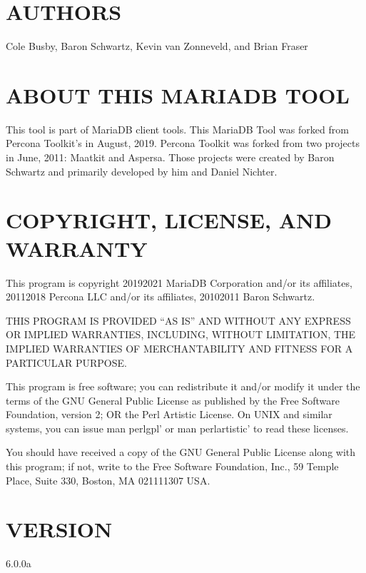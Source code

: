 \documentclass[letterpaper,10pt,english]{sphinxmanual}
\begin{document}
\section{AUTHORS}
\label{\detokenize{mariadb-system-summary:authors}}
Cole Busby, Baron Schwartz, Kevin van Zonneveld, and Brian Fraser


\section{ABOUT THIS MARIADB TOOL}
\label{\detokenize{mariadb-system-summary:about-this-mariadb-tool}}
This tool is part of MariaDB client tools. This MariaDB Tool was forked from
Percona Toolkit’s  in August, 2019. Percona Toolkit was
forked from two projects in June, 2011: Maatkit and Aspersa.  Those projects
were created by Baron Schwartz and primarily developed by him and Daniel Nichter.


\section{COPYRIGHT, LICENSE, AND WARRANTY}
\label{\detokenize{mariadb-system-summary:copyright-license-and-warranty}}
This program is copyright 2019\sphinxhyphen{}2021 MariaDB Corporation and/or its affiliates,
2011\sphinxhyphen{}2018 Percona LLC and/or its affiliates, 2010\sphinxhyphen{}2011 Baron Schwartz.

THIS PROGRAM IS PROVIDED “AS IS” AND WITHOUT ANY EXPRESS OR IMPLIED
WARRANTIES, INCLUDING, WITHOUT LIMITATION, THE IMPLIED WARRANTIES OF
MERCHANTABILITY AND FITNESS FOR A PARTICULAR PURPOSE.

This program is free software; you can redistribute it and/or modify it under
the terms of the GNU General Public License as published by the Free Software
Foundation, version 2; OR the Perl Artistic License.  On UNIX and similar
systems, you can issue \textasciigrave{}man perlgpl’ or \textasciigrave{}man perlartistic’ to read these
licenses.

You should have received a copy of the GNU General Public License along with
this program; if not, write to the Free Software Foundation, Inc., 59 Temple
Place, Suite 330, Boston, MA  02111\sphinxhyphen{}1307  USA.


\section{VERSION}
\label{\detokenize{mariadb-system-summary:version}}
 6.0.0a
\end{document}
